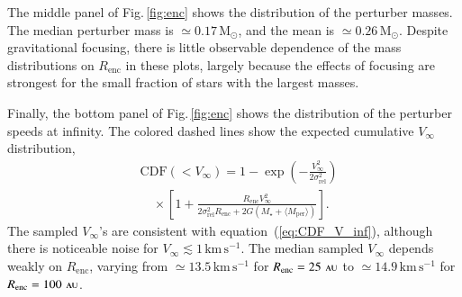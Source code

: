 \documentclass[iop,usenatbib]{emulateapj}
\newcommand{\F}{Fig.}
\newcommand{\msun}{\mathrm{M}_\odot}
\newcommand{\au}{\,\textsc{au}}
\newcommand{\renc}{R_\mathrm{enc}}
\newcommand{\mper}{M_\mathrm{per}}
\newcommand{\srel}{\sigma_\mathrm{rel}}
\begin{document}
The middle panel of \F\,\ref{fig:enc} shows the distribution of the perturber masses. The median perturber mass is $\simeq 0.17\,\msun$, and the mean is $\simeq 0.26 \,\msun$. Despite gravitational focusing, there is little observable dependence of the mass distributions on $\renc$ in these plots, largely because the effects of focusing are strongest for the small fraction of stars with the largest masses. 

Finally, the bottom panel of \F\,\ref{fig:enc} shows the distribution of the perturber speeds at infinity. The colored dashed lines show the expected cumulative $V_\infty$ distribution, 
\begin{align}
\label{eq:CDF_V_inf}
\nonumber &\mathrm{CDF}(<V_\infty) = 1 - \exp \left ( -\frac{V_\infty^2}{2\srel^2} \right ) \\
&\quad \times \left[ 1 + \frac{\renc V_\infty^2}{2\srel^2 \renc + 2 G (M_\star + \langle \mper \rangle )} \right ].
\end{align}
The sampled $V_\infty$'s are consistent with equation~(\ref{eq:CDF_V_inf}), although there is noticeable noise for $V_\infty\lesssim 1\,\mathrm{km\,s^{-1}}$. The median sampled $V_\infty$ depends weakly on $\renc$, varying from $\simeq 13.5\, \mathrm{km\,s^{-1}}$ for $\renc=25\,\au$ to $\simeq 14.9\, \mathrm{km\,s^{-1}}$ for $\renc=100\,\au$.
\end{document}
